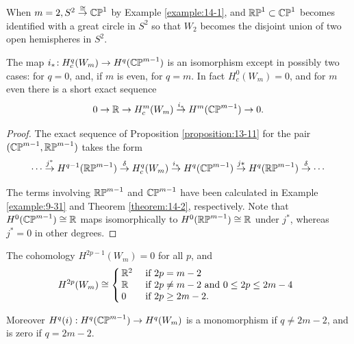 When $m = 2,{S}^{2}\overset{ \cong  }{ \rightarrow  }{\mathbb{CP}}^{1}$ by Example \ref{example:14-1}, and $\mathbb{RP}^{1} \subset  {\mathbb{CP}}^{1}$ 
becomes identified with a great circle in ${S}^{2}$ so that ${W}_{2}$ becomes the disjoint union of two open 
hemispheres in ${S}^{2}$.

\begin{lemma}\label{lemma:20-8}
  The map ${i}_{ * }\!: H_{c}^{q}( {W}_{m})  \rightarrow  H^{q}( {\mathbb{CP}}^{m- 1})$ is an isomorphism except in 
  possibly two cases: for $q = 0$, and, if $m$ is even, for $q = m$. In fact $H_{c}^{0}( {W}_{m})  = 0$, 
  and for $m$ even there is a short exact sequence
  \[
    0 \rightarrow  \mathbb{R} \rightarrow  H_{c}^{m}( {W}_{m}) \overset{{i}_{ * }}{ \rightarrow  }H^{m}( {\mathbb{CP}}^{m- 1})  \rightarrow  0.
  \]
\end{lemma}

\begin{proof}
  The exact sequence of Proposition \ref{proposition:13-11} for the pair $( {{\mathbb{CP}}^{m- 1}, \mathbb{RP}^{m- 1}})$ takes the form
  \[
    \cdots \overset{{j}^*}
    { \rightarrow  }H^{q- 1}( \mathbb{RP}^{m- 1}) 
    \overset{\delta }{ \rightarrow  }
    H_{c}^{q}( {W}_{m}) 
    \overset{{i}_{ * }}{ \rightarrow  }
    H^{q}( {\mathbb{CP}}^{m- 1}) 
    \overset{j * }{ \rightarrow  }H^{q}( \mathbb{RP}^{m- 1}) 
    \overset{\delta }{ \rightarrow  }
    \cdots
  \]
  
  The terms involving $\mathbb{RP}^{m-1}$ and ${\mathbb{CP}}^{m- 1}$ have been calculated in Example \ref{example:9-31} and Theorem \ref{theorem:14-2}, 
  respectively. Note that $H^{0}({\mathbb{CP}}^{m- 1})\cong\mathbb{R}$ maps isomorphically to $H^{0}( \mathbb{RP}^{m- 1})\cong\mathbb{R}$ 
  under ${j}^*$, whereas ${j}^* = 0$ in other degrees.
\end{proof}

\begin{proposition}\label{proposition:20-9}
  The cohomology $H^{{2p}- 1}( {W}_{m})  = 0$ for all $p$, and
  \[
    H^{2p}( {W}_{m})  \cong  
    \left\{\!\!\begin{array}{ll} 
      {\ensuremath{\mathbb{R}}}^{2} & \text{ if }{2p} = m- 2 \\  
      \mathbb{R} & \text{ if }{2p} \neq  m- 2\text{ and }0 \leq  {2p} \leq  {2m}- 4 \\ 
      0 & \text{ if }{2p} \geq  {2m}- 2. 
    \end{array}\right.
  \]
  
  Moreover $H^{q}( i)  : H^{q}( {\mathbb{CP}}^{m- 1})  \rightarrow  H^{q}( {W}_{m})$ is a monomorphism if $q \neq  {2m}- 2$, and 
  is zero if $q = {2m}- 2$.
\end{proposition}

